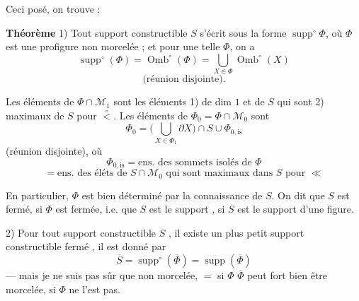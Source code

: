 \documentclass[11pt,a4paper]{article}
\begin{document}
Ceci posé, on trouve :

\textbf{Théorème} 1) Tout support constructible $S$ s'écrit sous la forme $\operatorname{supp}^\circ\Phi$, où $\Phi$ est une profigure non morcelée\add{*} ;  et pour une telle $\Phi$, on a
\[ \operatorname{supp}^\circ(\Phi) = \operatorname{Omb}^\circ(\Phi) = \bigcup_{X\in\Phi}\operatorname{Omb}^\circ(X) \]
\[ \text{(réunion disjointe).} \]


 Les éléments de $\Phi\cap\mathcal{M}_1$ sont les éléments 1) de dim $1$ et de $S$ qui sont   2) maximaux de $S$ pour $\overset{\circ}{<}$. Les   éléments de $\Phi_0=\Phi\cap\mathcal{M}_0$ sont 
\[ \Phi_0 = \Big(\bigcup_{X\in\Phi_1}\partial X\Big)\cap S \cup \Phi_{0,\mathrm{is}} \]
(réunion disjointe), où 
\[ \Phi_{0,\mathrm{is}} = \text{ens. des sommets isolés de } \Phi \]
\[ = \text{ens. des éléts de } S\cap\mathcal{M}_0 \text{ qui sont maximaux dans } S \text{ pour } \ll \]
\struck{\ill{}}

\struck{\ill{}} En particulier, $\Phi$ est bien déterminé par la connaissance de $S$. On dit que $S$ est fermé, si $\Phi$ est fermée, i.e. que $S$ est le support , si $S$ est le support d'une figure.

2) Pour tout support constructible $S$ \struck{\ill{}} , il existe un plus petit support constructible fermé , il est donné par
\[ \overline{S} = \operatorname{supp}^\circ(\overline{\Phi}) = \operatorname{supp}(\overline{\Phi}) \]
— mais je ne suis pas sûr \ill{} que  \ill{} non morcelée, $=$ si $\Phi$ \ill{} $\overline{\Phi}$ peut fort bien être morcelée, si $\Phi$ ne l'est pas.

\end{document}
